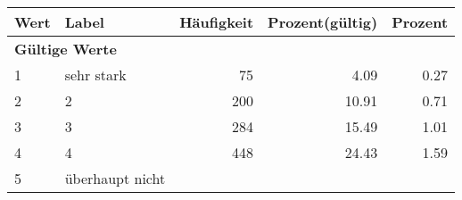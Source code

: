      \begin{longtable}{lXrrr}
     \toprule
     \textbf{Wert} & \textbf{Label} & \textbf{Häufigkeit} & \textbf{Prozent(gültig)} & \textbf{Prozent} \\
     \endhead
     \midrule
     \multicolumn{5}{l}{\textbf{Gültige Werte}}\\

     1 &
     \multicolumn{1}{X}{ sehr stark   } &


       \num{75} &
       \num[round-mode=places,round-precision=2]{4.09} &
         \num[round-mode=places,round-precision=2]{0.27} \\

     2 &
     \multicolumn{1}{X}{ 2   } &


       \num{200} &
       \num[round-mode=places,round-precision=2]{10.91} &
         \num[round-mode=places,round-precision=2]{0.71} \\

     3 &
     \multicolumn{1}{X}{ 3   } &


       \num{284} &
       \num[round-mode=places,round-precision=2]{15.49} &
         \num[round-mode=places,round-precision=2]{1.01} \\

     4 &
     \multicolumn{1}{X}{ 4   } &


       \num{448} &
       \num[round-mode=places,round-precision=2]{24.43} &
         \num[round-mode=places,round-precision=2]{1.59} \\

     5 &
     \multicolumn{1}{X}{ überhaupt nicht   } &



\end{longtable}
